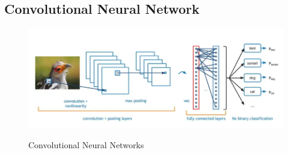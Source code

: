 

\subsection{Convolutional Neural Network}

\begin{figure} [ht] \centering  
  \includegraphics[scale=0.75]{gambar/teori-dasar-cnn.png}
  \caption{Convolutional Neural Networks}
  \label{fig:convolutionalneuralnetworks}
  \parencite{CNN}
\end{figure}

